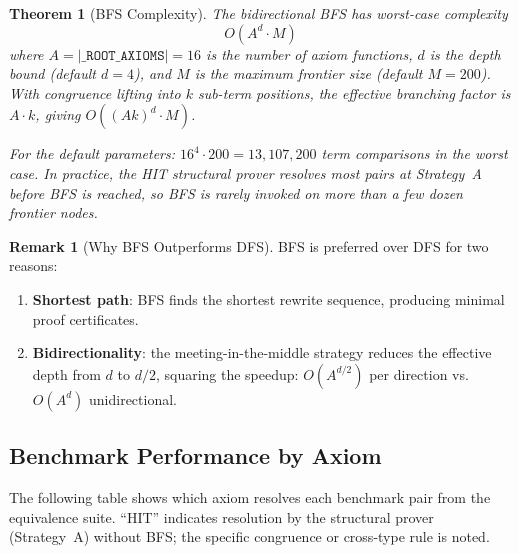 \documentclass[11pt,a4paper]{report}
\theoremstyle{definition}
\newtheorem{remark}[definition]{Remark}
\theoremstyle{plain}
\newtheorem{theorem}[definition]{Theorem}
\begin{document}
\begin{theorem}[BFS Complexity]
\label{thm:bfs-complexity}
The bidirectional BFS has worst-case complexity
\[
  O(A^d \cdot M)
\]
where $A = |\mathtt{\_ROOT\_AXIOMS}| = 16$ is the number of axiom
functions, $d$ is the depth bound (default $d = 4$), and
$M$ is the maximum frontier size (default $M = 200$).  With
congruence lifting into $k$ sub-term positions, the effective
branching factor is $A \cdot k$, giving $O((Ak)^d \cdot M)$.

For the default parameters: $16^4 \cdot 200 = 13{,}107{,}200$
term comparisons in the worst case.  In practice, the HIT
structural prover resolves most pairs at Strategy~A
before BFS is reached, so BFS is rarely invoked on more than
a few dozen frontier nodes.
\end{theorem}

\begin{remark}[Why BFS Outperforms DFS]
BFS is preferred over DFS for two reasons:
\begin{enumerate}
  \item \textbf{Shortest path}: BFS finds the shortest rewrite
    sequence, producing minimal proof certificates.
  \item \textbf{Bidirectionality}: the meeting-in-the-middle strategy
    reduces the effective depth from $d$ to $d/2$, squaring the
    speedup: $O(A^{d/2})$ per direction vs.\ $O(A^d)$ unidirectional.
\end{enumerate}
\end{remark}

\subsection{Benchmark Performance by Axiom}
\label{sec:benchmark-axioms}

The following table shows which axiom resolves each benchmark pair
from the equivalence suite.  ``HIT'' indicates resolution by the
structural prover (Strategy~A) without BFS; the specific congruence
or cross-type rule is noted.
\end{document}

